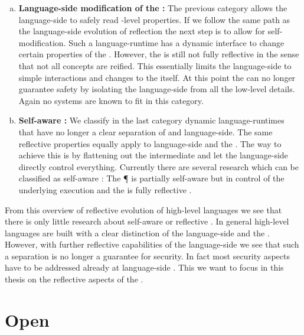 \begin{enumerate}[a), nolistsep]
\item \textbf{Language-side modification of the \VM:}
	The previous category allows the language-side to safely read \VM-level properties.
	If we follow the same path as the language-side evolution of reflection the next step is to allow for self-modification.
	Such a language-runtime has a dynamic interface to change certain properties of the \VM.
	However, the \VM is still not fully reflective in the sense that not all \VM concepts are reified.
	This essentially limits the language-side to simple interactions and changes to the \VM itself.
	At this point the \VM can no longer guarantee safety by isolating the language-side from all the low-level details.
	Again no systems are known to fit in this category.
	
\item \textbf{Self-aware \VM:}
	We classify in the last category dynamic language-runtimes that have no longer a clear separation of \VM and language-side.
	The same reflective properties equally apply to language-side and the \VM.
	The way to achieve this is by flattening out the intermediate \VM and let the language-side directly control everything.
	Currently there are several research \VMs which can be classified as self-aware \VMs: The \P \VM \cite{Verw12a} is partially self-aware but in control of the underlying execution and the \Klein \VM is fully reflective \cite{Unga05a}. 
\end{enumerate}


\noindent From this overview of reflective evolution of high-level languages we see that there is only little research about self-aware \VMs or reflective \VMs.
In general high-level languages are built with a clear distinction of the language-side and the \VM.
However, with further reflective capabilities of the language-side we see that such a separation is no longer a guarantee for security.
In fact most security aspects have to be addressed already at language-side \cite{??}.
This we want to focus in this thesis on the reflective aspects of the \VM.


\section{Open \VMs}
\\
 \\
\\

